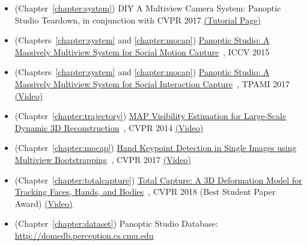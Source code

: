 \begin{itemize}
	
	\item (Chapter~\ref{chapter:system}) DIY A Multiview Camera System: Panoptic Studio Teardown, in conjunction with CVPR 2017 \href{http://domedb.perception.cs.cmu.edu/tutorials/cvpr17/index.html}{(Tutorial Page)}
	
	\item (Chapters~\ref{chapter:system} and \ref{chapter:mocap}) \href{https://ieeexplore.ieee.org/document/7410738}{Panoptic Studio: A Massively Multiview System for Social Motion Capture}~\cite{Joo-15}, ICCV 2015 
	
	\item (Chapters~\ref{chapter:system} and \ref{chapter:mocap}) \href{https://ieeexplore.ieee.org/document/8187699}{Panoptic Studio: A Massively Multiview System for Social Interaction Capture}~\cite{joo2017panoptic}, TPAMI 2017 \href{https://www.youtube.com/watch?v=m0-7HnWvxG4}{(Video)}
	
	\item (Chapter~\ref{chapter:trajectory}) \href{https://jhugestar.github.io/14/CVPR_2014_Visibility.pdf}{MAP Visibility Estimation for Large-Scale Dynamic 3D Reconstruction}~\cite{joo_cvpr_2014}, CVPR 2014 \href{https://www.youtube.com/watch?v=LaHTjBWago8}{(Video)}
	
	\item (Chapter~\ref{chapter:mocap}) \href{https://arxiv.org/abs/1704.07809}{Hand Keypoint Detection in Single Images using Multiview Bootstrapping}~\cite{simon2017hand}, CVPR 2017 \href{https://www.youtube.com/watch?v=Lajt6vS_dSM}{(Video)}	
	
	\item (Chapter~\ref{chapter:totalcapture}) \href{http://openaccess.thecvf.com/content_cvpr_2018/papers/Joo_Total_Capture_A_CVPR_2018_paper.pdf}{Total Capture: A 3D Deformation Model for Tracking Faces, Hands, and Bodies}~\cite{joo2018}, CVPR 2018 (Best Student Paper Award) \href{https://www.youtube.com/watch?v=5QzdXQSf-oY}{(Video)}	
	
	\item (Chapter~\ref{chapter:dataset}) Panoptic Studio Database: \url{http://domedb.perception.cs.cmu.edu}
	
	
\end{itemize}



